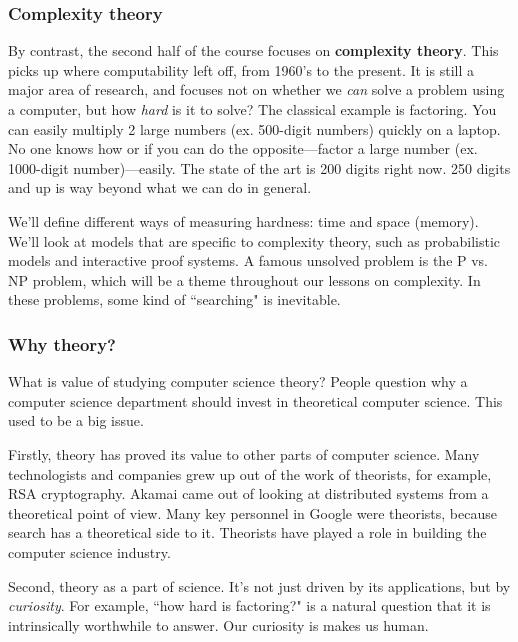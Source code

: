 \subsubsection{Complexity theory}

By contrast, the second half of the course focuses on \textbf{complexity theory}. This picks up where computability left off, from 1960's to the present. It is still a major area of research, and focuses not on whether we \emph{can} solve a problem using a computer, but how \emph{hard} is it to solve? The classical example is factoring. You can easily multiply 2 large numbers (ex. 500-digit numbers) quickly on a laptop. No one knows how or if you can do the opposite---factor a large number (ex. 1000-digit number)---easily. The state of the art is 200 digits right now. 250 digits and up is way beyond what we can do in general. %

We'll define different ways of measuring hardness: time and space (memory). We'll look at models that are specific to complexity theory, such as probabilistic models and interactive proof systems. A famous unsolved problem is the P vs. NP problem, which will be a theme throughout our lessons on complexity. In these problems, some kind of ``searching" is inevitable.

\subsubsection{Why theory?}

What is value of studying computer science theory? People question why a computer science department should invest in theoretical computer science. This used to be a big issue. 

Firstly, theory has proved its value to other parts of computer science. Many technologists and companies grew up out of the work of theorists, for example, RSA cryptography. Akamai  %
came out of looking at distributed systems from a theoretical point of view. %
Many key personnel in Google were theorists, because search has a theoretical side to it. Theorists have played a role in building the computer science industry.

Second, theory as a part of science. It's not just driven by its applications, but by {\it curiosity}. For example, ``how hard is factoring?" is a natural question that it is intrinsically worthwhile to answer.
Our curiosity is makes us human.

